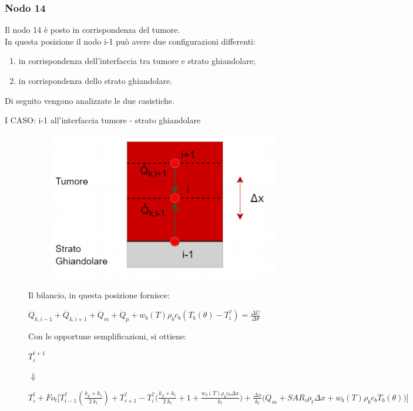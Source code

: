 \subsubsection*{Nodo 14}
Il nodo 14 è posto in corrispondenza del tumore.\\
In questa posizione il nodo i-1 può avere due configurazioni differenti:
\begin{enumerate}
    \item in corrispondenza dell'interfaccia tra tumore e strato ghiandolare;
    \item in corrispondenza dello strato ghiandolare.
\end{enumerate}
Di seguito vengono analizzate le due casistiche.
\begin{description}
    \item[I CASO: i-1 all'interfaccia tumore - strato ghiandolare]
    \begin{figure}[H]
    \centering
    \includegraphics[width=.6\textwidth]{Immagini/Nodi/nodo14.1.png} 
    \label{nodo14}
\end{figure}
\noindent
Il bilancio, in questa posizione fornisce:
\begin{center}
	$ \Dot{Q} _{k, i-1} +\Dot{Q} _{k, i+1}+ \Dot{Q} _{m} +\Dot{Q} _{p}+ w_b (T) \rho _b c_b (T_b(\theta)-T_i ^?)= \frac{\Delta U}{\Delta \theta} $
\end{center}
Con le opportune semplificazioni, si ottiene:
\begin{center}
	$T_i ^{t+1} $
\end{center}
\begin{center}
	$\Downarrow$
\end{center}
\begin{center}
	$T_i ^t + Fo_{t} \Bigg[ T_{i-1} ^? (\frac{k_g+ k_{t}}{2 \: k_t}) + T_{i+1} ^?- T_i ^? \Big(\frac{k_g+ k_{t}}{2 \: k_t} + 1 + \frac{ w_b (T) \rho _b c_b \Delta x }{k_{t}} \Big) + \frac{\Delta x }{k_{t}} \Big(\Dot{Q} _{m} +  SAR_i \rho _{t} \Delta x + w_b (T) \rho _b c_b T_b(\theta)\Big) \Bigg]$
\end{center}



\end{description}
